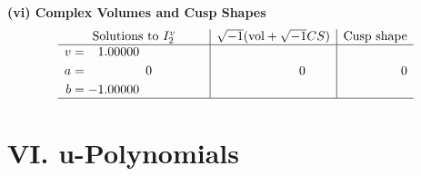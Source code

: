 \documentclass[1p]{elsarticle_modified}
\theoremstyle{definition}
\newcommand{\I}{\sqrt{-1}}
\begin{document}
\newpage\flushleft \textbf{(vi) Complex Volumes and Cusp Shapes}
$$\begin{array}{c|c|c}  
\text{Solutions to }I^v_{2}& \I (\text{vol} + \sqrt{-1}CS) & \text{Cusp shape}\\
 \hline 
\begin{aligned}
v &= \phantom{-}1.00000\phantom{ +0.000000I} \\
a &= \phantom{-0.000000 } 0 \\
b &= -1.00000\phantom{ +0.000000I}\end{aligned}
 & \phantom{-0.000000 } 0 & \phantom{-0.000000 } 0\\
 \hline 
 \end{array}$$\newpage
\newpage\renewcommand{\arraystretch}{1}
\centering \section*{ VI. u-Polynomials}
\end{document}
